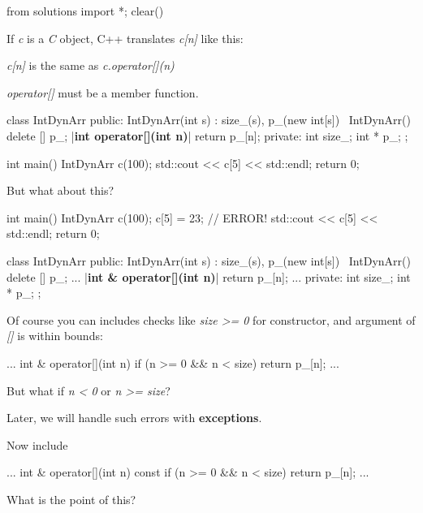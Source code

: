 \begin{python0}
from solutions import *; clear()
\end{python0}

If \textit{c} is a \textit{C} object, C++ translates \textit{c[n]} like
this:

\textit{c[n]} is the same as \textit{c.operator[](n)}

\textit{operator[]} must be a member function.

\begin{consolethree}[escapeinside=||]
class IntDynArr
{
public:
    IntDynArr(int s)
        : size_(s), p_(new int[s])
    {}
    ~IntDynArr() { delete [] p_; }
    |{\bf int operator[](int n)}| { return p_[n]; }
private:
    int size_;
    int * p_;
};
\end{consolethree}

\begin{consolethree}[escapeinside=||]
int main()
{
    IntDynArr c(100);
    std::cout << c[5] << std::endl;
    return 0;
}
\end{consolethree}

But what about this?

\begin{consolethree}[escapeinside=||]
int main()
{
    IntDynArr c(100);
    c[5] = 23; // ERROR!
    std::cout << c[5] << std::endl;
    return 0;
}
\end{consolethree}

\begin{consolethree}[escapeinside=||]
class IntDynArr
{
public:
    IntDynArr(int s)
        : size_(s), p_(new int[s])
    {}
    ~IntDynArr() { delete [] p_; }
    ...
    |{\bf int \& operator[](int n)}|
    {
        return p_[n];
    }
    ...
private:
    int size_;
    int * p_;
};
\end{consolethree}

Of course you can includes checks like \textit{size >= 0} for
constructor, and argument of \textit{[]} is within bounds:

\begin{consolethree}[escapeinside=||]
...
int & operator[](int n)
{
    if (n >= 0 && n < size)
        return p_[n];
}
...
\end{consolethree}

But what if \textit{n < 0} or \textit{n >= size}?

Later, we will handle such errors with \textbf{exceptions}.

Now include

\begin{consolethree}[escapeinside=||]
...
int & operator[](int n) const
{
    if (n >= 0 && n < size)
        return p_[n];
}
...
\end{consolethree}

What is the point of this?


